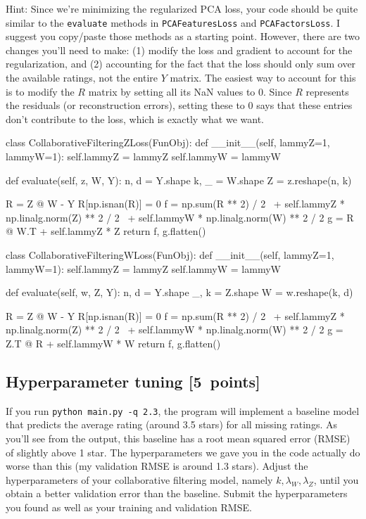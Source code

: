 \documentclass{article}
\newcommand{\blu}[1]{{\textcolor{blu}{#1}}}
\let\ask\blu
\newcommand\pts[1]{\textcolor{pointscolour}{[#1~points]}}
\begin{document}
Hint: Since we're minimizing the regularized PCA loss, your code should be quite similar to the \texttt{evaluate} methods in \texttt{PCAFeaturesLoss} and \texttt{PCAFactorsLoss}. I suggest you copy/paste those methods as a starting point. However, there are two changes you'll need to make: (1) modify the loss and gradient to account for the regularization, and (2) accounting for the fact that the loss should only sum over the available ratings, not the entire $Y$ matrix. The easiest way to account for this is to modify the $R$ matrix by setting all its NaN values to 0. Since $R$ represents the residuals (or reconstruction errors), setting these to 0 says that these entries don't contribute to the loss, which is exactly what we want.
\vspace{1em}
\begin{python}
class CollaborativeFilteringZLoss(FunObj):
    def __init__(self, lammyZ=1, lammyW=1):
        self.lammyZ = lammyZ
        self.lammyW = lammyW

    def evaluate(self, z, W, Y):
        n, d = Y.shape
        k, _ = W.shape
        Z = z.reshape(n, k)

        R = Z @ W - Y
        R[np.isnan(R)] = 0
        f = np.sum(R ** 2) / 2 \
            + self.lammyZ * np.linalg.norm(Z) ** 2 / 2 \
            + self.lammyW * np.linalg.norm(W) ** 2 / 2
        g = R @ W.T + self.lammyZ * Z
        return f, g.flatten()



class CollaborativeFilteringWLoss(FunObj):
    def __init__(self, lammyZ=1, lammyW=1):
        self.lammyZ = lammyZ
        self.lammyW = lammyW

    def evaluate(self, w, Z, Y):
        n, d = Y.shape
        _, k = Z.shape
        W = w.reshape(k, d)

        R = Z @ W - Y
        R[np.isnan(R)] = 0
        f = np.sum(R ** 2) / 2 \
            + self.lammyZ * np.linalg.norm(Z) ** 2 / 2 \
            + self.lammyW * np.linalg.norm(W) ** 2 / 2
        g = Z.T @ R + self.lammyW * W
        return f, g.flatten()
\end{python}


\subsection{Hyperparameter tuning \pts{5}}
If you run \texttt{python main.py -q 2.3}, the program will implement a baseline model that predicts the average rating (around 3.5 stars) for all missing ratings.
As you'll see from the output, this baseline has a root mean squared error (RMSE) of slightly above 1 star. The hyperparameters we gave you in the code actually do worse than this (my validation RMSE is around 1.3 stars). \ask{Adjust the hyperparameters of your collaborative filtering model, namely $k,\lambda_W,\lambda_Z$, until you obtain a better validation error than the baseline. Submit the hyperparameters you found as well as your training and validation RMSE.}
\end{document}
